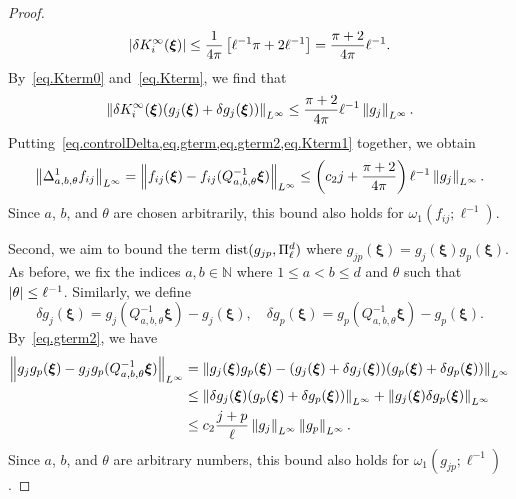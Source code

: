 \begin{proof}
\begin{equation}\label{eq.Kterm}
    \left|\delta {K}_i^\infty(\mathbf{\boldsymbol\xi})\right| \leq \frac{1}{4\pi} \left[\ell^{-1}\pi + 2\ell^{-1}\right] = \frac{\pi+2}{4\pi} \ell^{-1}.
\end{equation}
By~\cref{eq.Kterm0} and~\cref{eq.Kterm}, we find that
\begin{equation}\label{eq.Kterm1}
    \left\lVert\delta {K}_i^\infty(\boldsymbol{\xi}) (g_j(\boldsymbol{\xi}) + \delta g_j(\boldsymbol{\xi}))\right\rVert_{L^\infty} \leq \frac{\pi+2}{4\pi} \ell^{-1} \left\lVert g_j\right\rVert_{L^\infty}.
\end{equation}
Putting~\cref{eq.controlDelta,eq.gterm,eq.gterm2,eq.Kterm1} together, we obtain
\begin{equation*}
    \left\lVert\Delta^1_{a,b,\theta}f_{ij}\right\rVert_{L^\infty} = \left\lVert f_{ij}(\boldsymbol{\xi}) - f_{ij}(Q^{-1}_{a,b,\theta}\boldsymbol{\xi})\right\rVert_{L^\infty} \leq \left(c_2 j + \frac{\pi + 2}{4\pi}\right)\ell^{-1}\left\lVert g_j\right\rVert_{L^\infty}.
\end{equation*}
Since $a$, $b$, and $\theta$ are chosen arbitrarily, this bound also holds for $\omega_1(f_{ij}; \ell^{-1})$.

Second, we aim to bound the term $\text{dist}(g_{jp},\Pi^d_{\ell})$ where $g_{jp}(\boldsymbol{\xi}) = g_j(\boldsymbol{\xi})g_p(\boldsymbol{\xi})$. As before, we fix the indices $a,b\in \mathbb{N}$ where $1 \leq a < b \leq d$ and $\theta$ such that $\left|\theta\right| \leq \ell^{-1}$. Similarly, we define 
\begin{equation*}
    \delta g_j(\boldsymbol{\xi}) = g_j(Q^{-1}_{a,b,\theta}\boldsymbol{\xi}) - g_j(\boldsymbol{\xi}), \quad \delta g_p(\boldsymbol{\xi}) = g_p(Q^{-1}_{a,b,\theta}\boldsymbol{\xi}) - g_p(\boldsymbol{\xi}).
\end{equation*}
By~\cref{eq.gterm2}, we have
\begin{equation}\label{eq.controlDelta2}
    \begin{aligned}
    \left\lVert g_jg_p(\boldsymbol{\xi}) - g_jg_p(Q^{-1}_{a,b,\theta}\boldsymbol{\xi})\right\rVert_{L^\infty} &= \left\lVert g_j(\boldsymbol{\xi}) g_p(\boldsymbol{\xi}) - (g_j(\boldsymbol{\xi}) + \delta g_j(\boldsymbol{\xi})) (g_p(\boldsymbol{\xi}) + \delta g_p(\boldsymbol{\xi}))\right\rVert_{L^\infty} \\
    &\leq \left\lVert\delta g_j(\boldsymbol{\xi}) (g_p(\boldsymbol{\xi}) + \delta g_p(\boldsymbol{\xi}))\right\rVert_{L^\infty} + \left\lVert g_j(\boldsymbol{\xi}) \delta g_p(\boldsymbol{\xi})\right\rVert_{L^\infty} \\
    &\leq c_2 \frac{j+p}{\ell}\left\lVert g_j\right\rVert_{L^\infty}\left\lVert g_p\right\rVert_{L^\infty}.
\end{aligned} 
\end{equation}
Since $a$, $b$, and $\theta$ are arbitrary numbers, this bound also holds for $\omega_1(g_{jp}; \ell^{-1})$.
\end{proof}

